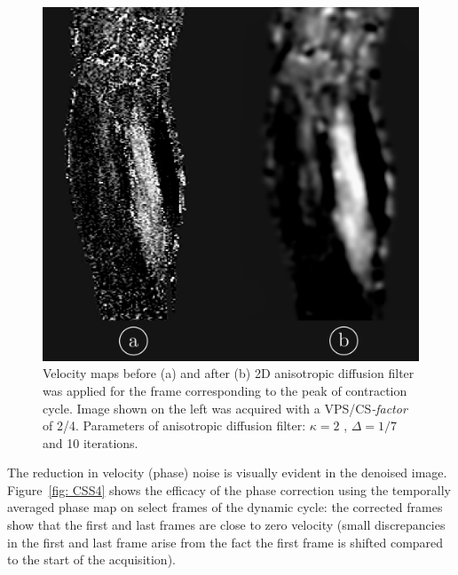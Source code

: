 \begin{figure}[!htb]
\vspace{+0.2cm}
\centering
\includegraphics[scale=0.17]{Figures/CS1_5.pdf}
\caption[Velocity maps before and after 2D anisotropic diffusion filter]{Velocity maps before (a) and after (b) 2D anisotropic diffusion filter was applied for the frame corresponding to the peak of contraction cycle. Image shown on the left was acquired with a VPS/\mbox{CS\textit{-factor}} of 2/4. Parameters of anisotropic diffusion filter: $\kappa = 2$ , $\Delta = 1/7$  and 10 iterations.}
\label{fig: CSS3}
\end{figure}
The reduction in velocity (phase) noise is visually evident in the denoised image. 
Figure~\ref{fig: CSS4} shows the efficacy of the phase correction using the temporally averaged phase map on select frames of the dynamic cycle: the corrected frames show that the first and last frames are close to zero velocity (small discrepancies in the first and last frame arise from the fact the first frame is shifted compared to the start of the acquisition). 
